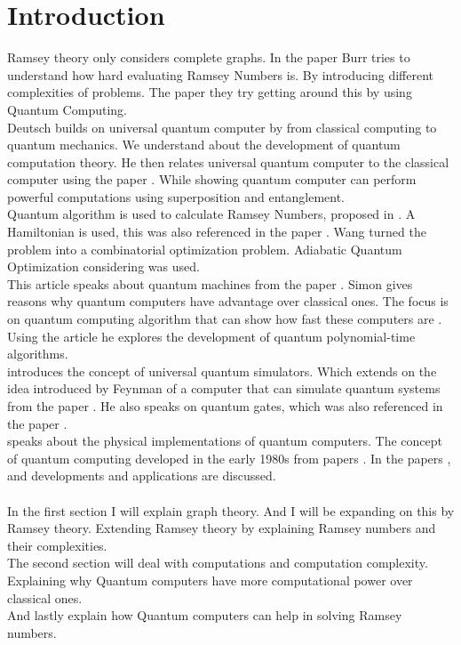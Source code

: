 \documentclass[12pt, a4paper]{Assignment}
\begin{document}
\section*{Introduction}
Ramsey theory only considers complete graphs. 
In the paper \cite{burr1981generalized} Burr tries to understand how hard evaluating Ramsey Numbers is.
By introducing different complexities of problems.
The paper \cite{PhysRevA.93.032301} they try getting around this by using Quantum Computing.
\newline
\\
Deutsch\cite{Deutsch1989} builds on universal quantum computer by \cite{deutsch1985quantum} from classical computing to quantum mechanics. 
We understand about the development of quantum computation theory.
He then relates universal quantum computer to the classical computer using the paper \cite{Turing1936}.
While showing quantum computer can perform powerful computations using superposition and entanglement.
\newline
\\
Quantum algorithm is used to calculate Ramsey Numbers, proposed in \cite{gaitan2012ramsey}.
A Hamiltonian is used, this was also referenced in the paper \cite{doi:10.1137/S0097539796298637}.
Wang turned the problem into a combinatorial optimization problem.
Adiabatic Quantum Optimization considering \cite{farhi2000quantum} was used.
\newline
\\
This article\cite{doi:10.1137/S0097539796298637} speaks about quantum machines from the paper \cite{Deutsch1989}.
Simon gives reasons why quantum computers have advantage over classical ones.
The focus is on quantum computing algorithm that can show how fast these computers are	.
Using the article \cite{shor1994algorithms} he explores the development of quantum polynomial-time algorithms.
\newline
\\
\cite{UQS} introduces the concept of universal quantum simulators. 
Which extends on the idea introduced by Feynman of a computer that can simulate quantum systems from the paper \cite{feynman1982simulating}. 
He also speaks on quantum gates, which was also referenced in the paper \cite{Deutsch1989}.
\newline
\\
\cite{rietsche2022quantum} speaks about the physical implementations of quantum computers. 
The concept of quantum computing developed in the early 1980s from papers \cite{feynman1982simulating}. 	
In the papers \cite{PhysRevA.93.032301}, \cite{doi:10.1137/S0097539796298637} and \cite{UQS} developments and applications are discussed.
\\\\
In the first section I will explain graph theory.
And I will be expanding on this by Ramsey theory.
Extending Ramsey theory by explaining Ramsey numbers and their complexities.
\\
The second section will deal with computations and computation complexity.
Explaining why Quantum computers have more computational power over classical ones.
\\
And lastly explain how Quantum computers can help in solving Ramsey numbers.
\end{document}
